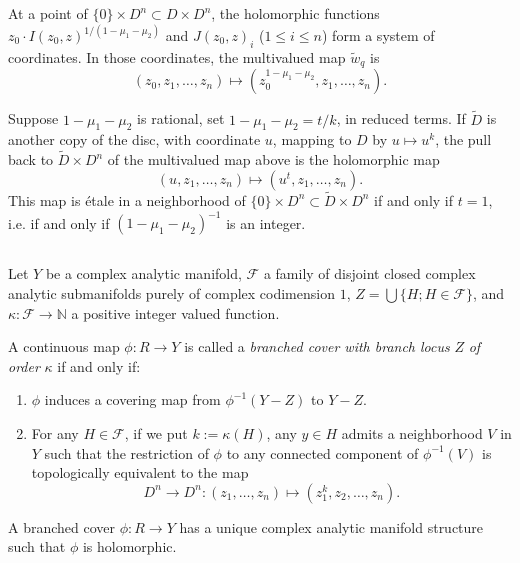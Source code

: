 \documentclass[12pt,a4paper]{article}
\theoremstyle{plain}
\theoremstyle{definition}
\theoremstyle{remark}
\begin{document}
At a point of $\{0\} \times D^n \subset D \times D^n$, the holomorphic functions $z_0 \cdot I(z_0, z)^{1/(1 - \mu_1 - \mu_2)}$ and $J(z_0, z)_i$ ($1 \leqslant i \leqslant n$) form a system of coordinates. In those coordinates, the multivalued map $\widetilde{w}_q$ is
\[
(z_0, z_1, \ldots, z_n) \mapsto (z_0^{1 - \mu_1 - \mu_2}, z_1, \ldots, z_n).
\]

Suppose $1 - \mu_1 - \mu_2$ is rational, set $1 - \mu_1 - \mu_2 = t/k$, in reduced terms. If $\widetilde{D}$ is another copy of the disc, with coordinate $u$, mapping to $D$ by $u \mapsto u^k$, the pull back to $\widetilde{D} \times D^n$ of the multivalued map above is the holomorphic map
\[
(u, z_1, \ldots, z_n) \mapsto (u^t, z_1, \ldots, z_n).
\]
This map is \'etale in a neighborhood of $\{0\} \times D^n \subset \widetilde{D} \times D^n$ if and only if $t = 1$, i.e. if and only if $(1 - \mu_1 - \mu_2)^{-1}$ is an integer.

\subsection{}
\label{9.7}

Let $Y$ be a complex analytic manifold, $\mathscr{F}$ a family of disjoint closed complex analytic submanifolds purely of complex codimension $1$, $Z = \bigcup\{H; H \in \mathscr{F}\}$, and $\kappa : \mathscr{F} \to \mathbb{N}$ a positive integer valued function.

A continuous map $\phi : R \to Y$ is called a \emph{branched cover with branch locus} $Z$ \emph{of order} $\kappa$ if and only if:
\begin{enumerate}
\item $\phi$ induces a covering map from $\phi^{-1}(Y - Z)$ to $Y - Z$.
\item For any $H \in \mathscr{F}$, if we put $k := \kappa(H)$, any $y \in H$ admits a neighborhood $V$ in $Y$ such that the restriction of $\phi$ to any connected component of $\phi^{-1}(V)$ is topologically equivalent to the map
\[
D^n \to D^n : (z_1, \ldots, z_n) \mapsto (z_1^k, z_2, \ldots, z_n).
\]
\end{enumerate}
A branched cover $\phi : R \to Y$ has a unique complex analytic manifold structure such that $\phi$ is holomorphic.
\end{document}
